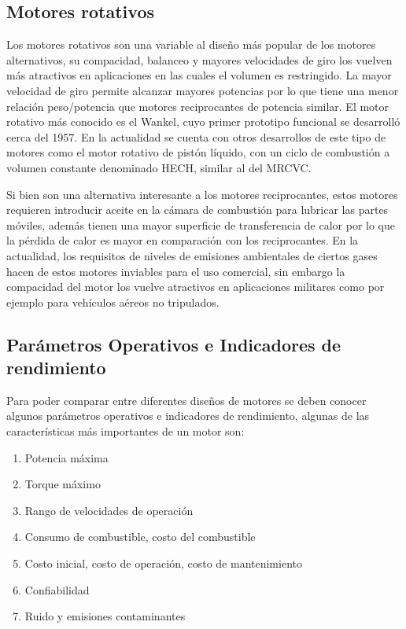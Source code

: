 
\subsection{Motores rotativos}
%
Los motores rotativos son una variable al diseño más popular de los motores
alternativos, su compacidad, balanceo y mayores velocidades de giro los vuelven
más atractivos en aplicaciones en las cuales el volumen es restringido.
%
La mayor velocidad de giro permite alcanzar mayores potencias por lo que tiene
una menor relación peso/potencia que motores reciprocantes de potencia similar.
%
El motor rotativo más conocido es el Wankel, cuyo primer prototipo funcional se
desarrolló cerca del 1957.
%
En la actualidad se cuenta con otros desarrollos de este tipo de motores como el
motor rotativo de pistón líquido, con un ciclo de combustión a volumen constante
denominado HECH\parencite{hehc_05}, similar al del MRCVC.

Si bien son una alternativa interesante a los motores reciprocantes, estos
motores requieren introducir aceite en la cámara de combustión para lubricar las
partes móviles, además tienen una mayor superficie de transferencia de calor por
lo que la pérdida de calor es mayor en comparación con los reciprocantes.
%
En la actualidad, los requisitos de niveles de emisiones ambientales de ciertos
gases hacen de estos motores inviables para el uso comercial, sin embargo la
compacidad del motor los vuelve atractivos en aplicaciones militares como por
ejemplo para vehículos aéreos no tripulados.



\subsection{Parámetros Operativos e Indicadores de rendimiento}
%
Para poder comparar entre diferentes diseños de motores se deben conocer algunos
parámetros operativos e indicadores de rendimiento, algunas de las
características más importantes de un motor son:
%
\begin{enumerate}
    \item Potencia máxima
    \item Torque máximo
    \item Rango de velocidades de operación
    \item Consumo de combustible, costo del combustible
    \item Costo inicial, costo de operación, costo de mantenimiento
    \item Confiabilidad
    \item Ruido y emisiones contaminantes
\end{enumerate}

